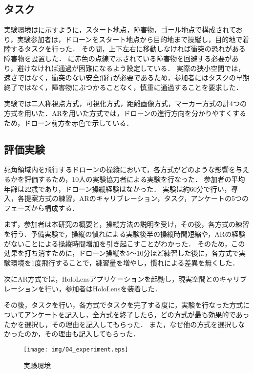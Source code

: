 \documentclass[submit, sigrecommended]{ipsj}
\begin{document}
\subsection{タスク}
実験環境はに示すように，スタート地点，障害物，ゴール地点で構成されており，実験参加者は，ドローンをスタート地点から目的地まで操縦し，目的地で着陸するタスクを行った．
その間，上下左右に移動しなければ衝突の恐れがある障害物を設置した．
に赤色の点線で示されている障害物を回避する必要があり，避けなければ通過が困難になるよう設定している．
実際の狭小空間では，速さではなく，衝突のない安全飛行が必要であるため，参加者にはタスクの早期終了ではなく，障害物にぶつかることなく，慎重に通過することを要求した．
\par
実験では二人称視点方式，可視化方式，距離画像方式，マーカー方式の計4つの方式を用いた．ARを用いた方式では，ドローンの進行方向を分かりやすくするため，ドローン前方を赤色で示している．


\subsection{評価実験}
死角領域内を飛行するドローンの操縦において，各方式がどのような影響を与えるかを評価するため，10人の実験協力者による実験を行なった．
参加者の平均年齢は22歳であり，ドローン操縦経験はなかった．
実験は約60分で行い，導入，各提案方式の練習，ARのキャリブレーション，タスク，アンケートの5つのフェーズから構成する．
\par
まず，参加者は本研究の概要と，操縦方法の説明を受け，その後，各方式の練習を行う．予備実験で，操縦の慣れによる実験後半の操縦時間短縮や，ARの経験がないことによる操縦時間増加を引き起こすことがわかった．
そのため，この効果を打ち消すために，ドローン操縦を5〜10分ほど練習した後に，各方式で実験環境を1度飛行することで，練習量を増やし，慣れによる差異を無くした．
\par
次にAR方式では，HoloLensアプリケーションを起動し，現実空間とのキャリブレーションを行い，参加者はHoloLensを装着した．
\par
その後，タスクを行い，各方式でタスクを完了する度に，実験を行なった方式についてアンケートを記入し，全方式を終了したら，どの方式が最も効果的であったかを選択し，その理由を記入してもらった．
また，なぜ他の方式を選択しなかったのか，その理由も記入してもらった．

\begin{figure}[tb]
  \centering
  \texttt{[image: img/04\_experiment.eps]}
  \caption{実験環境}
  \label{fig:04_experiment}
\end{figure}
\end{document}
